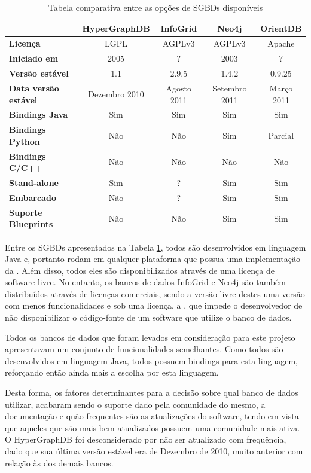 \begin{table}[!htb]
	\centering
	\caption{Tabela comparativa entre as opções de SGBDs disponíveis}
	\label{tab:bancos}
	\begin{tabular}{lcccc}
		\hline
		& \textbf{HyperGraphDB} & \textbf{InfoGrid} & \textbf{Neo4j} & \textbf{OrientDB} \\
		\hline
		\textbf{Licença} & LGPL & AGPLv3 & AGPLv3 & Apache \\
		\textbf{Iniciado em} & 2005 & ? & 2003 & ? \\
		\textbf{Versão estável} & 1.1 & 2.9.5 & 1.4.2 & 0.9.25 \\
		\textbf{Data versão estável} & Dezembro 2010 & Agosto 2011 & Setembro 2011 & Março 2011 \\
		\textbf{Bindings Java} & Sim & Sim & Sim & Sim \\
		\textbf{Bindings Python} & Não & Não & Sim & Parcial \\
		\textbf{Bindings C/C++} & Não & Não & Não & Não \\
		\textbf{Stand-alone} & Sim & ? & Sim & Sim \\
		\textbf{Embarcado} & Não & ? & Sim & Sim \\
		\textbf{Suporte Blueprints} & Não & Não & Sim & Sim \\
		\hline
	\end{tabular}
\end{table}

Entre os SGBDs apresentados na Tabela \ref{tab:bancos}, todos são desenvolvidos em linguagem Java e, portanto rodam em qualquer plataforma que possua uma implementação da .
Além disso, todos eles são disponibilizados através de uma licença de software livre.
No entanto, os bancos de dados InfoGrid e Neo4j são também distribuídos através de licenças comerciais, sendo a versão livre destes uma versão com menos funcionalidades e sob uma licença, a , que impede o desenvolvedor de não disponibilizar o código-fonte de um software que utilize o banco de dados. %

Todos os bancos de dados que foram levados em consideração para este projeto apresentavam um conjunto de funcionalidades semelhantes.
Como todos são desenvolvidos em linguagem Java, todos possuem bindings para esta linguagem, reforçando então ainda mais a escolha por esta linguagem.

Desta forma, os fatores determinantes para a decisão sobre qual banco de dados utilizar, acabaram sendo o suporte dado pela comunidade do mesmo, a documentação e quão frequentes são as atualizações do software, tendo em vista que aqueles que são mais bem atualizados possuem uma comunidade mais ativa.
O HyperGraphDB foi desconsiderado por não ser atualizado com frequência, dado que sua última versão estável era de Dezembro de 2010, muito anterior com relação às dos demais bancos.

